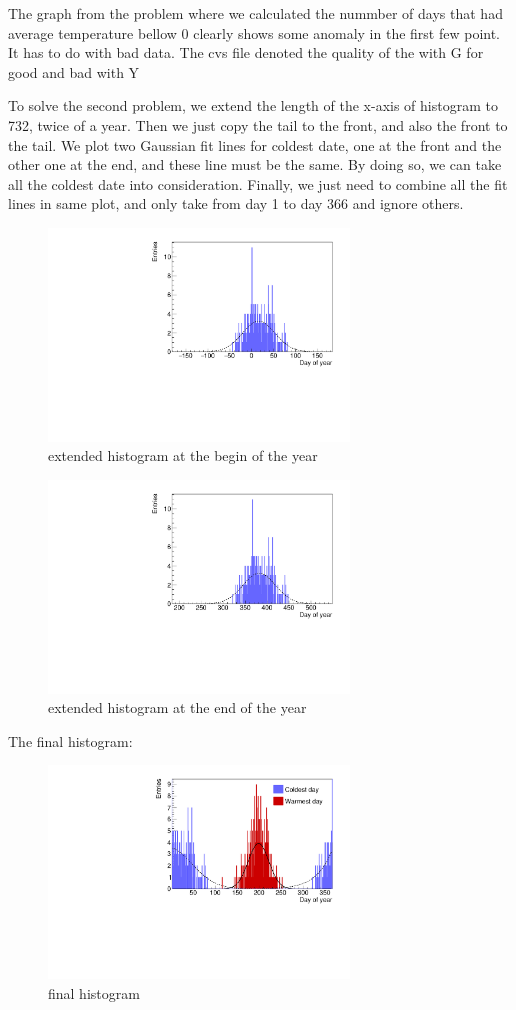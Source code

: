 \documentclass[a4paper]{article}
\begin{document}
\begin{enumerate}
The graph from the problem where we calculated the nummber of days that had average temperature bellow 0 clearly shows some anomaly in the first few point. It has to do with bad data. The cvs file denoted the quality of the with G for good and bad with Y 



To solve the second problem, we extend the length of the x-axis of histogram to 732, twice of a year. Then we just copy the tail to the front, and also the front to the tail. We plot two Gaussian fit lines for coldest date, one at the front and the other one at the end, and these line must be the same. By doing so, we can take all the coldest date into consideration. Finally, we just need to combine all the fit lines in same plot, and only take from day 1 to day 366 and ignore others.
\begin{figure}[htp]
    \centering
    \includegraphics[width=8cm]{./images/hotCold_Upp_cold_1}
    \caption{extended histogram at the begin of the year}
    \label{fig:hist}
\end{figure}
\begin{figure}[htp]
    \centering
    \includegraphics[width=8cm]{./images/hotCold_Upp_cold_2}
    \caption{extended histogram at the end of the year}
    \label{fig:hist}
\end{figure}

The final histogram:
\begin{figure}[htp]
    \centering
    \includegraphics[width=8cm]{./images/hotCold_Upp_final}
    \caption{final histogram}
    \label{fig:hist}
\end{figure}
\end{enumerate}
\end{document}
